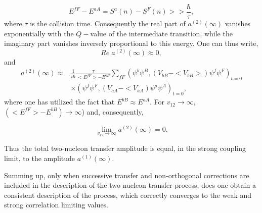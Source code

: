 \begin{subappendices}
\begin{equation}
E^{fF} - E^{aA} = S^a(n) - S^F(n) >> \frac{\hbar}{\tau},
\end{equation}
where $\tau$ is the collision time. Consequently the real part of $a^{(2)}(\infty)$ vanishes exponentially  with the $Q-$value of the intermediate transition, while the imaginary part  vanishes inversely proportional to this energy.
One can thus write,
\begin{equation}
Re \;  a^{(2)} (\infty) \approx 0,
\end{equation} 
and 
\begin{equation}
\begin{split}
a^{(2)}(\infty) \approx &\frac{1}{i \hbar} \frac{\tau}{<E^{fF}> - E^{bB}} 
\sum_{fF} (\psi^b \psi^B, 
(V_{bB}- <V_{bB}>) 
\psi^f\psi^F)_{t=0}\\
& \times 
(\psi^f\psi^F,(V_{aA} - <V_{aA}) \psi^a \psi^A)_{t=0},
\end{split}
\end{equation} 
where one has utilized the fact that $E^{bB} \approx E^{aA}$. For $v_{12} \to \infty$, $(<E^{fF}> - E^{bB}) \to \infty$)
and, consequently, 

\begin{equation}
\lim_{v_{12} \to \infty} a^{(2)} (\infty) = 0.
\end{equation} 

Thus the total two-nucleon transfer amplitude is equal, in the strong coupling limit, to the amplitude $a^{(1)} (\infty)$.


Summing up, only when successive transfer and non-orthogonal corrections are included in the description of the two-nucleon 
transfer process, does one obtain a consistent description of the process, which correctly converges to the weak and 
strong correlation limiting values.


\end{subappendices}
